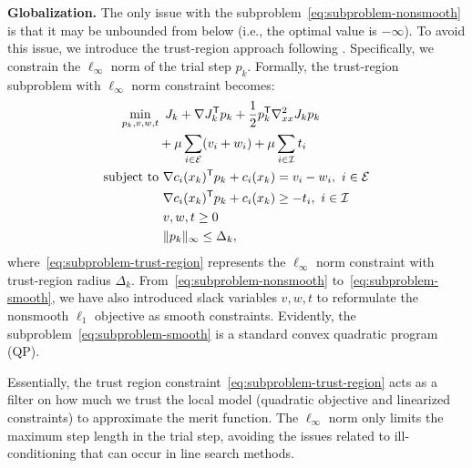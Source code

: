 \textbf{Globalization.}
The only issue with the subproblem~\eqref{eq:subproblem-nonsmooth} is that it may be unbounded from below (i.e., the optimal value is $-\infty$).
To avoid this issue, we introduce the trust-region approach following \cite{nocedal1999springer-numerical-optimization}. Specifically, we constrain the $\ell_{\infty}$ norm of the trial step $p_k$. Formally, the trust-region subproblem with $\ell_\infty$ norm constraint becomes:
\begin{subequations} \label{eq:subproblem-smooth}
    \begin{align}
        \min_{p_k, v, w, t} & \displaystyle \,\,\,J_k + \nabla J_k^{\mathsf{T}} p_k  + \frac{1}{2} p_k^{\mathsf{T}} \nabla_{xx}^2 J_k p_k \nonumber \\
        & + \mu \sum_{i \in \mathcal{E}} (v_i + w_i) + \mu \sum_{i \in \mathcal{I}} t_i  \\
        \text{subject to} &\,\, \nabla c_i(x_k)^{\mathsf{T}} p_k + c_i(x_k) = v_i - w_i, \ i \in \mathcal{E} \label{eq:subproblem-smooth-eq}\\
        & \,\, \nabla c_i(x_k)^{\mathsf{T}} p_k + c_i(x_k) \ge -t_i, \ i \in \mathcal{I} \label{eq:subproblem-smooth-ineq}\\
        & \,\, v, w, t \ge 0 \\
        & \,\, \|p_k\|_\infty \le \Delta_k, \label{eq:subproblem-trust-region}
    \end{align}
\end{subequations}
where~\eqref{eq:subproblem-trust-region} represents the $\ell_\infty$ norm constraint with trust-region radius $\Delta_k$. From~\eqref{eq:subproblem-nonsmooth} to~\eqref{eq:subproblem-smooth}, we have also introduced slack variables $v,w,t$ to reformulate the nonsmooth $\ell_1$ objective as smooth constraints. Evidently, the subproblem~\eqref{eq:subproblem-smooth} is a standard convex quadratic program (QP).

Essentially, the trust region constraint~\eqref{eq:subproblem-trust-region} acts as a filter on how much we trust the local model (quadratic objective and linearized constraints) to approximate the merit function. The $\ell_{\infty}$ norm only limits the maximum step length in the trial step, avoiding the issues related to ill-conditioning that can occur in line search methods.


